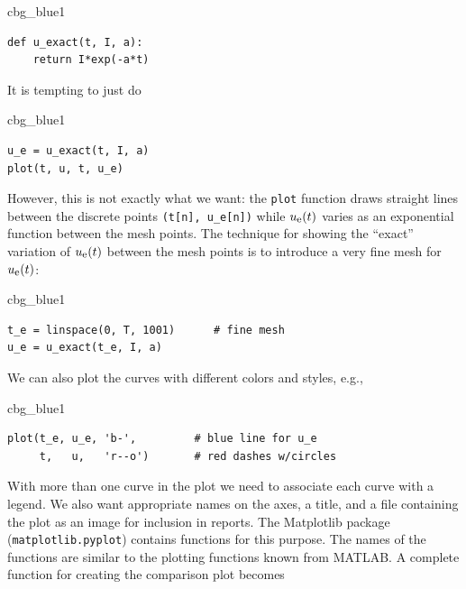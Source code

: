 \documentclass[%
oneside,                 %
final,                   %
10pt]{article}
\newenvironment{_cod_tight}[1]{
   \def\FrameCommand{\colorbox{#1}}
   \FrameRule0.6pt\MakeFramed {\FrameRestore}\vskip3mm}
   {\vskip0mm\endMakeFramed}
\newenvironment{cod}[1]{
\bgroup\rmfamily
\fboxsep=0mm\relax
\begin{_cod_tight}{#1}
\list{}{\parsep=-2mm\parskip=0mm\topsep=0pt\leftmargin=2mm
\rightmargin=2\leftmargin\leftmargin=4pt\relax}
\item\relax}
{\endlist\end{_cod_tight}\egroup}
\begin{document}
\begin{cod}{cbg_blue1}\begin{Verbatim}[numbers=none,fontsize=\fontsize{9pt}{9pt},baselinestretch=0.95,xleftmargin=2mm]
def u_exact(t, I, a):
    return I*exp(-a*t)
\end{Verbatim}
\end{cod}
\noindent
It is tempting to just do

\begin{cod}{cbg_blue1}\begin{Verbatim}[numbers=none,fontsize=\fontsize{9pt}{9pt},baselinestretch=0.95,xleftmargin=2mm]
u_e = u_exact(t, I, a)
plot(t, u, t, u_e)
\end{Verbatim}
\end{cod}
\noindent
However, this is not exactly what we want: the \texttt{plot} function draws
straight lines between the discrete points \Verb!(t[n], u_e[n])! while
$\uex(t)$ varies as an exponential function between the mesh points.
The technique for showing the ``exact'' variation of $\uex(t)$ between
the mesh points is to introduce a very fine mesh for $\uex(t)$:

\begin{cod}{cbg_blue1}\begin{Verbatim}[numbers=none,fontsize=\fontsize{9pt}{9pt},baselinestretch=0.95,xleftmargin=2mm]
t_e = linspace(0, T, 1001)      # fine mesh
u_e = u_exact(t_e, I, a)
\end{Verbatim}
\end{cod}
\noindent
We can also plot the curves with different colors and styles, e.g.,

\begin{cod}{cbg_blue1}\begin{Verbatim}[numbers=none,fontsize=\fontsize{9pt}{9pt},baselinestretch=0.95,xleftmargin=2mm]
plot(t_e, u_e, 'b-',         # blue line for u_e
     t,   u,   'r--o')       # red dashes w/circles
\end{Verbatim}
\end{cod}
\noindent

With more than one curve in the plot we need to associate each curve
with a legend. We also want appropriate names on the axes, a title,
and a file containing the plot as an image for inclusion in reports.
The Matplotlib package (\texttt{matplotlib.pyplot}) contains functions for
this purpose. The names of the functions are similar to the plotting
functions known from MATLAB.  A complete function for creating
the comparison plot becomes
\end{document}
